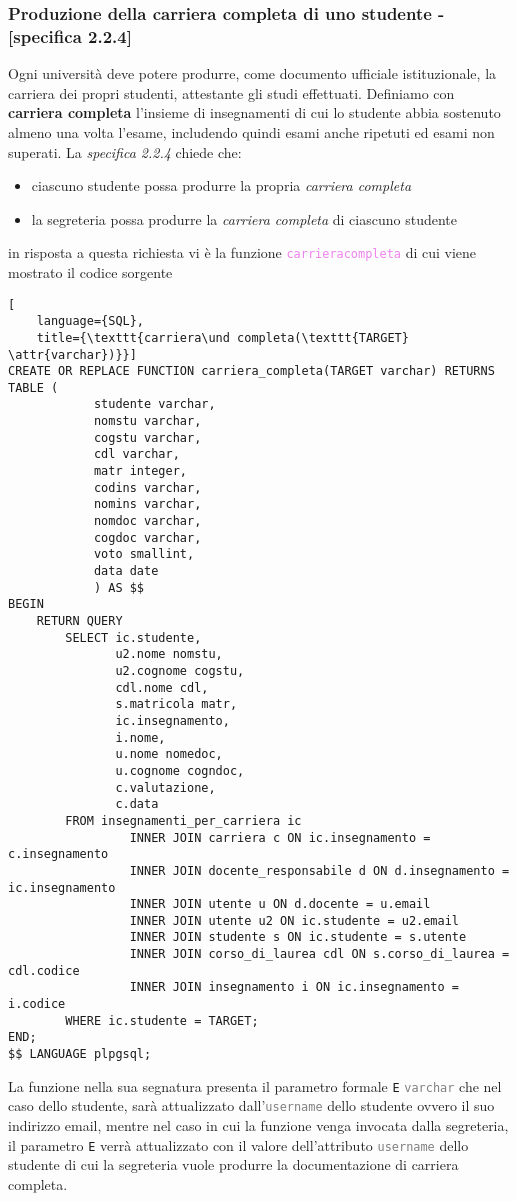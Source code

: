 \documentclass{article}
\newcommand{\attr}[1]{\texttt{\textcolor{gray}{#1}}}
\newcommand{\sqlfunc}[1]{\texttt{\textcolor{violet}{#1}}}
\newcommand{\und}[0]{\textunderscore}
\begin{document}
\subsubsection{Produzione della carriera completa di uno studente - [specifica 2.2.4]}
Ogni università deve potere produrre, come documento ufficiale istituzionale, la carriera dei propri studenti, attestante gli studi effettuati. Definiamo con \textbf{carriera completa} l'insieme di insegnamenti di cui lo studente abbia sostenuto almeno una volta l'esame, includendo quindi esami anche ripetuti ed esami non superati.
La \textit{specifica 2.2.4} chiede che:
\begin{itemize}
    \item ciascuno studente possa produrre la propria \textit{carriera completa}
    \item la segreteria possa produrre la \textit{carriera completa} di ciascuno studente
\end{itemize}
in risposta a questa richiesta vi è la funzione \sqlfunc{carriera\und completa} di cui viene mostrato il codice sorgente
\begin{lstlisting}[
    language={SQL},
    title={\texttt{carriera\und completa(\texttt{TARGET} \attr{varchar})}}]
CREATE OR REPLACE FUNCTION carriera_completa(TARGET varchar) RETURNS TABLE (
            studente varchar,
            nomstu varchar,
            cogstu varchar,
            cdl varchar,
            matr integer,
            codins varchar,
            nomins varchar,
            nomdoc varchar,
            cogdoc varchar,
            voto smallint,
            data date
            ) AS $$
BEGIN
    RETURN QUERY
        SELECT ic.studente,
               u2.nome nomstu,
               u2.cognome cogstu,
               cdl.nome cdl,
               s.matricola matr,
               ic.insegnamento,
               i.nome,
               u.nome nomedoc,
               u.cognome cogndoc,
               c.valutazione,
               c.data
        FROM insegnamenti_per_carriera ic
                 INNER JOIN carriera c ON ic.insegnamento = c.insegnamento
                 INNER JOIN docente_responsabile d ON d.insegnamento = ic.insegnamento
                 INNER JOIN utente u ON d.docente = u.email
                 INNER JOIN utente u2 ON ic.studente = u2.email
                 INNER JOIN studente s ON ic.studente = s.utente
                 INNER JOIN corso_di_laurea cdl ON s.corso_di_laurea = cdl.codice
                 INNER JOIN insegnamento i ON ic.insegnamento = i.codice
        WHERE ic.studente = TARGET;
END;
$$ LANGUAGE plpgsql;
\end{lstlisting}
La funzione nella sua segnatura presenta il parametro formale \texttt{E} \attr{varchar} che nel caso dello studente, sarà attualizzato dall'\attr{username} dello studente ovvero il suo indirizzo email, mentre nel caso in cui la funzione venga invocata dalla segreteria, il parametro \texttt{E} verrà attualizzato con il valore dell'attributo \attr{username} dello studente di cui la segreteria vuole produrre la documentazione di carriera completa.
\end{document}
